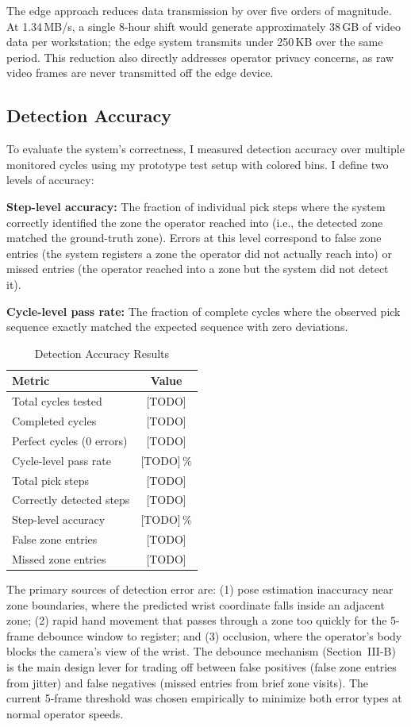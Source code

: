 \documentclass[conference]{IEEEtran}
\begin{document}
The edge approach reduces data transmission by over five orders of magnitude. At 1.34\,MB/s, a single 8-hour shift would generate approximately 38\,GB of video data per workstation; the edge system transmits under 250\,KB over the same period. This reduction also directly addresses operator privacy concerns, as raw video frames are never transmitted off the edge device.

\subsection{Detection Accuracy}
To evaluate the system's correctness, I measured detection accuracy over multiple monitored cycles using my prototype test setup with colored bins. I define two levels of accuracy:

\textbf{Step-level accuracy:} The fraction of individual pick steps where the system correctly identified the zone the operator reached into (i.e., the detected zone matched the ground-truth zone). Errors at this level correspond to false zone entries (the system registers a zone the operator did not actually reach into) or missed entries (the operator reached into a zone but the system did not detect it).

\textbf{Cycle-level pass rate:} The fraction of complete cycles where the observed pick sequence exactly matched the expected sequence with zero deviations.

\begin{table}[htbp]
\caption{Detection Accuracy Results}
\label{tab:accuracy}
\centering
\begin{tabular}{lc}
\toprule
\textbf{Metric} & \textbf{Value} \\
\midrule
Total cycles tested & [TODO] \\
Completed cycles & [TODO] \\
Perfect cycles (0 errors) & [TODO] \\
Cycle-level pass rate & [TODO]\,\% \\
\midrule
Total pick steps & [TODO] \\
Correctly detected steps & [TODO] \\
Step-level accuracy & [TODO]\,\% \\
\midrule
False zone entries & [TODO] \\
Missed zone entries & [TODO] \\
\bottomrule
\end{tabular}
\end{table}

The primary sources of detection error are: (1) pose estimation inaccuracy near zone boundaries, where the predicted wrist coordinate falls inside an adjacent zone; (2) rapid hand movement that passes through a zone too quickly for the 5-frame debounce window to register; and (3) occlusion, where the operator's body blocks the camera's view of the wrist. The debounce mechanism (Section~III-B) is the main design lever for trading off between false positives (false zone entries from jitter) and false negatives (missed entries from brief zone visits). The current 5-frame threshold was chosen empirically to minimize both error types at normal operator speeds.
\end{document}
